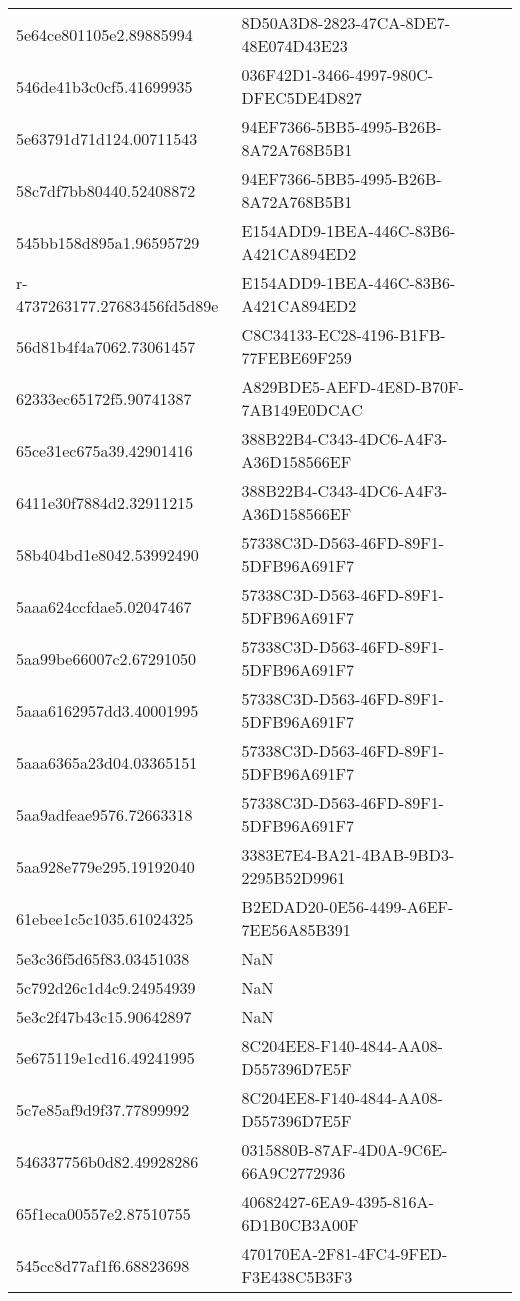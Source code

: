 \begin{tabular}{ll}
5e64ce801105e2.89885994 & 8D50A3D8-2823-47CA-8DE7-48E074D43E23 \\
546de41b3c0cf5.41699935 & 036F42D1-3466-4997-980C-DFEC5DE4D827 \\
5e63791d71d124.00711543 & 94EF7366-5BB5-4995-B26B-8A72A768B5B1 \\
58c7df7bb80440.52408872 & 94EF7366-5BB5-4995-B26B-8A72A768B5B1 \\
545bb158d895a1.96595729 & E154ADD9-1BEA-446C-83B6-A421CA894ED2 \\
r-4737263177.27683456fd5d89e & E154ADD9-1BEA-446C-83B6-A421CA894ED2 \\
56d81b4f4a7062.73061457 & C8C34133-EC28-4196-B1FB-77FEBE69F259 \\
62333ec65172f5.90741387 & A829BDE5-AEFD-4E8D-B70F-7AB149E0DCAC \\
65ce31ec675a39.42901416 & 388B22B4-C343-4DC6-A4F3-A36D158566EF \\
6411e30f7884d2.32911215 & 388B22B4-C343-4DC6-A4F3-A36D158566EF \\
58b404bd1e8042.53992490 & 57338C3D-D563-46FD-89F1-5DFB96A691F7 \\
5aaa624ccfdae5.02047467 & 57338C3D-D563-46FD-89F1-5DFB96A691F7 \\
5aa99be66007c2.67291050 & 57338C3D-D563-46FD-89F1-5DFB96A691F7 \\
5aaa6162957dd3.40001995 & 57338C3D-D563-46FD-89F1-5DFB96A691F7 \\
5aaa6365a23d04.03365151 & 57338C3D-D563-46FD-89F1-5DFB96A691F7 \\
5aa9adfeae9576.72663318 & 57338C3D-D563-46FD-89F1-5DFB96A691F7 \\
5aa928e779e295.19192040 & 3383E7E4-BA21-4BAB-9BD3-2295B52D9961 \\
61ebee1c5c1035.61024325 & B2EDAD20-0E56-4499-A6EF-7EE56A85B391 \\
5e3c36f5d65f83.03451038 & NaN \\
5c792d26c1d4c9.24954939 & NaN \\
5e3c2f47b43c15.90642897 & NaN \\
5e675119e1cd16.49241995 & 8C204EE8-F140-4844-AA08-D557396D7E5F \\
5c7e85af9d9f37.77899992 & 8C204EE8-F140-4844-AA08-D557396D7E5F \\
546337756b0d82.49928286 & 0315880B-87AF-4D0A-9C6E-66A9C2772936 \\
65f1eca00557e2.87510755 & 40682427-6EA9-4395-816A-6D1B0CB3A00F \\
545cc8d77af1f6.68823698 & 470170EA-2F81-4FC4-9FED-F3E438C5B3F3 \\

\end{tabular}
